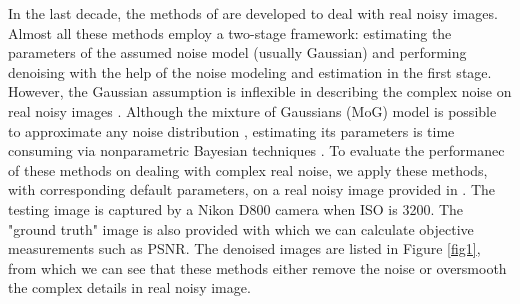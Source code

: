 \documentclass[10pt,twocolumn,letterpaper]{article}
\begin{document}
In the last decade, the methods of \cite{fullyblind,rabie2005robust,Liu2008,almapg,noiseclinic,ncwebsite,Zhu_2016_CVPR,crosschannel2016} are developed to deal with real noisy images. Almost all these methods employ a two-stage framework: estimating the parameters of the assumed noise model (usually Gaussian) and performing denoising with the help of the noise modeling and estimation in the first stage. However, the Gaussian assumption is inflexible in describing the complex noise on real noisy images \cite{Liu2008}. Although the mixture of Gaussians (MoG) model is possible to approximate any noise distribution \cite{Bishop}, estimating its parameters is time consuming via nonparametric Bayesian techniques \cite{Zhu_2016_CVPR}. To evaluate the performanec of these methods on dealing with complex real noise, we apply these methods, with corresponding default parameters, on a real noisy image provided in \cite{crosschannel2016}. The testing image is captured by a Nikon D800 camera when ISO is 3200. The "ground truth" image is also provided with which we can calculate objective measurements such as PSNR. The denoised images are listed in Figure \ref{fig1}, from which we can see that these methods either remove the noise or oversmooth the complex details in real noisy image. 
\end{document}
